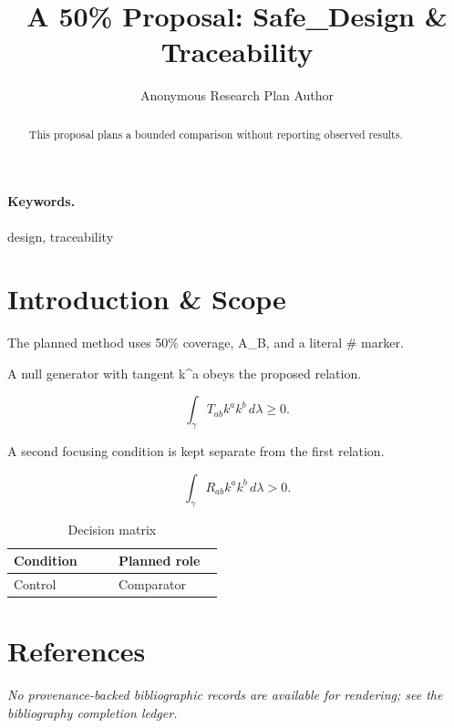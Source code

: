 \documentclass{article}
\title{A 50\% Proposal: Safe\_Design \& Traceability}
\author{Anonymous Research Plan Author}
\begin{document}
\maketitle
\begin{abstract}
This proposal plans a bounded comparison without reporting observed results.
\end{abstract}
\paragraph{Keywords.} design, traceability
\section{Introduction \& Scope}
The planned method uses 50\% coverage, A\_B, and a literal \# marker.

A null generator with tangent k\textasciicircum{}a obeys the proposed relation.

\begin{equation}
\int_\gamma T_{ab} k^a k^b \, d\lambda \geq 0 .
\label{eq:introduction-B2}
\end{equation}

A second focusing condition is kept separate from the first relation.

\begin{equation*}
\int_\gamma R_{ab} k^a k^b \, d\lambda > 0 .
\end{equation*}

\begin{table}[htbp]
\centering
\small


\caption{Decision matrix}
\label{tab:introduction-B3}
\begin{tabular}{|p{0.45\linewidth}|p{0.45\linewidth}|}
\hline
Condition & Planned role \\\hline
Control & Comparator \\\hline
\end{tabular}
\end{table}
\section*{References}
\emph{No provenance-backed bibliographic records are available for rendering; see the bibliography completion ledger.}
\end{document}
